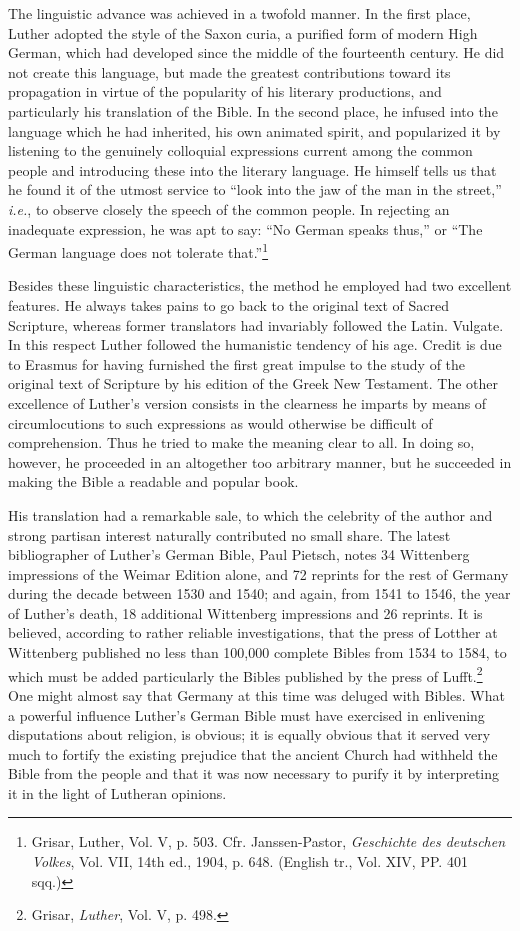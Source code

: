 The linguistic advance was achieved in a twofold manner. In the
first place, Luther adopted the style of the Saxon curia, a purified
form of modern High German, which had developed since the middle
of the fourteenth century. He did not create this language, but made
the greatest contributions toward its propagation in virtue of the
popularity of his literary productions, and particularly his translation
of the Bible. In the second place, he infused into the language which
he had inherited, his own animated spirit, and popularized it by
listening to the genuinely colloquial expressions current among the
common people and introducing these into the literary language. He
himself tells us that he found it of the utmost service to “look into
the jaw of the man in the street,” \textit{i.e.}, to observe closely the speech
of the common people. In rejecting an inadequate expression, he was
apt to say: “No German speaks thus,” or “The German language
does not tolerate that.”\footnote
{Grisar, Luther, Vol. V, p. 503. Cfr. Janssen-Pastor, \textit{Geschichte des deutschen Volkes},
Vol. VII, 14th ed., 1904, p. 648. (English tr., Vol. XIV, PP. 401 sqq.)}

Besides these linguistic characteristics, the method he employed had
two excellent features. He always takes pains to go back to the
original text of Sacred Scripture, whereas former translators had
invariably followed the Latin. Vulgate. In this respect Luther followed
the humanistic tendency of his age. Credit is due to Erasmus
for having furnished the first great impulse to the study of the
original text of Scripture by his edition of the Greek New Testament.
The other excellence of Luther’s version consists in the clearness he
imparts by means of circumlocutions to such expressions as would
otherwise be difficult of comprehension. Thus he tried to make the
meaning clear to all. In doing so, however, he proceeded in an altogether
too arbitrary manner, but he succeeded in making the Bible a
readable and popular book.

His translation had a remarkable sale, to which the celebrity of
the author and strong partisan interest naturally contributed no small
share. The latest bibliographer of Luther’s German Bible, Paul Pietsch,
notes 34 Wittenberg impressions of the Weimar Edition alone, and
72 reprints for the rest of Germany during the decade between 1530
and 1540; and again, from 1541 to 1546, the year of Luther’s death,
18 additional Wittenberg impressions and 26 reprints. It is believed,
according to rather reliable investigations, that the press of Lotther
at Wittenberg published no less than 100,000 complete Bibles from
1534 to 1584, to which must be added particularly the Bibles published
by the press of Lufft.\footnote{Grisar, \textit{Luther}, Vol. V, p. 498.}
One might almost say that Germany
at this time was deluged with Bibles. What a powerful influence
Luther’s German Bible must have exercised in enlivening disputations
about religion, is obvious; it is equally obvious that it served
very much to fortify the existing prejudice that the ancient Church
had withheld the Bible from the people and that it was now necessary
to purify it by interpreting it in the light of Lutheran opinions.

